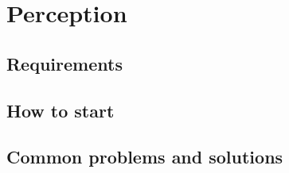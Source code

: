 \documentclass[main.tex]{subfiles}
\begin{document}
	\chapter{Perception}
	
	\section{Requirements}
	
	\section{How to start}
	
	\section{Common problems and solutions}
\end{document}
